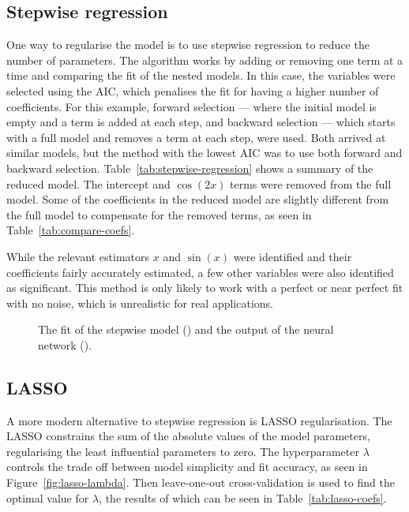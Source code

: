 \subsection{Stepwise regression}

One way to regularise the model is to use stepwise regression to reduce the number of parameters.
The algorithm works by adding or removing one term at a time and comparing the fit of the nested models.
In this case, the variables were selected using the \ac{AIC}, which penalises the fit for having a higher number of coefficients.
For this example, forward selection --- where the initial model is empty and a term is added at each step, and backward selection --- which starts with a full model and removes a term at each step, were used.
Both arrived at similar models, but the method with the lowest \ac{AIC} was to use both forward and backward selection.
Table~\ref{tab:stepwise-regression} shows a summary of the reduced model.
The intercept and \(\cos(2x)\) terms were removed from the full model.
Some of the coefficients in the reduced model are slightly different from the full model to compensate for the removed terms, as seen in Table~\ref{tab:compare-coefs}.


While the relevant estimators \(x\) and \(\sin(x)\) were identified and their coefficients fairly accurately estimated, a few other variables were also identified as significant.
This method is only likely to work with a perfect or near perfect fit with no noise, which is unrealistic for real applications.

\begin{figure}[htbp]
	\centering
	
	\caption{The fit of the stepwise model (\srcolour) and the output of the neural network (\nncolour).}
	\label{fig:stepwise-regression-fit}
\end{figure}

\subsection{LASSO}

A more modern alternative to stepwise regression is \ac{LASSO} regularisation.
The \ac{LASSO} constrains the sum of the absolute values of the model parameters, regularising the least influential parameters to zero.
The hyperparameter \(\lambda\) controls the trade off between model simplicity and fit accuracy, as seen in Figure~\ref{fig:lasso-lambda}.
Then leave-one-out cross-validation is used to find the optimal value for \(\lambda\), the results of which can be seen in Table~\ref{tab:lasso-coefs}.


